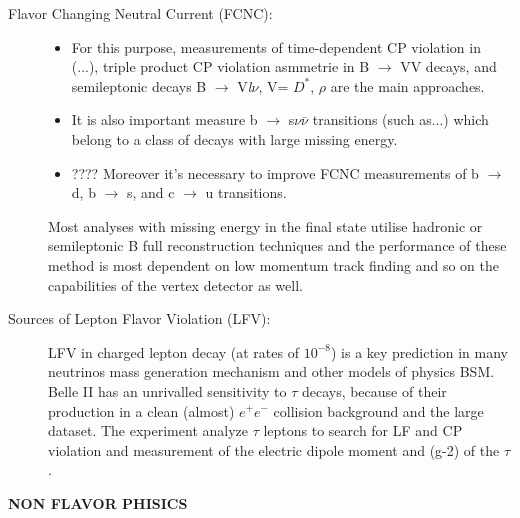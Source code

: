\begin{description}
\item[Flavor Changing Neutral Current (FCNC):] 
	\begin{itemize}
	\item For this purpose, measurements of time-dependent CP violation in (...), triple product CP violation asmmetrie in B $\rightarrow$ VV decays, and semileptonic decays B $\rightarrow$ V\textit{l}$\nu$, V= $D^{*}$, $\rho$ are the main approaches. 
	\item It is also important measure b $\rightarrow$ s$\nu\bar{\nu}$ transitions (such as...) which belong to a class of decays with large missing energy. 
	\item???? Moreover it's necessary to improve FCNC measurements of b $\rightarrow$ d, b $\rightarrow$ s, and c $\rightarrow$ u transitions. 
	\end{itemize}
	
Most analyses with missing energy in the final state utilise hadronic or semileptonic B full reconstruction techniques and the performance of these method is most dependent on low momentum track finding and so on the capabilities of the vertex detector as well.

\item [Sources of Lepton Flavor Violation (LFV):] LFV in charged lepton decay (at rates of $10^{-8}$) is a key prediction in many neutrinos mass generation mechanism and other models of physics BSM. Belle II has an unrivalled sensitivity to $\tau$ decays, because of their production in a clean (almost) $e^{+}e^{-}$ collision background and the large dataset. The experiment analyze $\tau$ leptons to search for LF and CP violation and measurement of the electric dipole moment and (g-2) of the $\tau$.

\end{description}

\hspace{.2cm}

\textbf{NON FLAVOR PHISICS}

